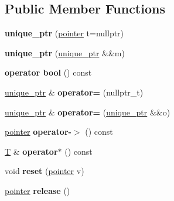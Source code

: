 \subsection*{Public Member Functions}
\begin{DoxyCompactItemize}
\item 
\mbox{\label{classfc_1_1unique__ptr_ae3b6625ef1d35bbdaf9ce25b5ef959ac}} 
{\bfseries unique\+\_\+ptr} (\mbox{\hyperlink{struct_t}{pointer}} t=nullptr)
\item 
\mbox{\label{classfc_1_1unique__ptr_a43c3dfad7a7f54d00162b783231cfd2b}} 
{\bfseries unique\+\_\+ptr} (\mbox{\hyperlink{classfc_1_1unique__ptr}{unique\+\_\+ptr}} \&\&m)
\item 
\mbox{\label{classfc_1_1unique__ptr_ad0a1bf993e0f1c82d8da966731214297}} 
{\bfseries operator bool} () const
\item 
\mbox{\label{classfc_1_1unique__ptr_a1a0128c9de71b55351a7c7d864f159a3}} 
\mbox{\hyperlink{classfc_1_1unique__ptr}{unique\+\_\+ptr}} \& {\bfseries operator=} (nullptr\+\_\+t)
\item 
\mbox{\label{classfc_1_1unique__ptr_a8aeff95b6c1f0fb95a2cedcd8217e5b3}} 
\mbox{\hyperlink{classfc_1_1unique__ptr}{unique\+\_\+ptr}} \& {\bfseries operator=} (\mbox{\hyperlink{classfc_1_1unique__ptr}{unique\+\_\+ptr}} \&\&o)
\item 
\mbox{\label{classfc_1_1unique__ptr_a03b7cde30febe65004e3232c3485bcb3}} 
\mbox{\hyperlink{struct_t}{pointer}} {\bfseries operator-\/$>$} () const
\item 
\mbox{\label{classfc_1_1unique__ptr_ad2a82141f3a0a4cbcae3be4f691e5d19}} 
\mbox{\hyperlink{struct_t}{T}} \& {\bfseries operator$\ast$} () const
\item 
\mbox{\label{classfc_1_1unique__ptr_afabaa48e02b058c61df6089f56b17cf6}} 
void {\bfseries reset} (\mbox{\hyperlink{struct_t}{pointer}} v)
\item 
\mbox{\label{classfc_1_1unique__ptr_a6e8a72b0514b82ada6764c6b4e377559}} 
\mbox{\hyperlink{struct_t}{pointer}} {\bfseries release} ()
\end{DoxyCompactItemize}
